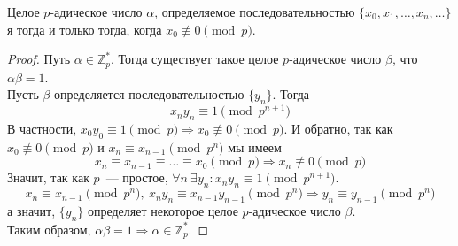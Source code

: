 \documentclass[11pt]{article}
\begin{document}
    \begin{theorem}
        Целое $p$-адическое число $\alpha$, определяемое
        последовательностью $\{ x_0, x_1, \ldots, x_n, \ldots \}$ я тогда и только тогда, когда $x_0 \not\equiv 0 \pmod{p}$.
    \end{theorem}
    \begin{proof}
        Путь $\alpha \in \mathbb{Z}_p^{*}$. Тогда существует такое целое $p$-адическое число $\beta$, что $\alpha \beta = 1$. \\
        Пусть $\beta$ определяется последовательностью $\{ y_n \}$. Тогда
        \[ x_n y_n \equiv 1 \pmod{p^{n + 1}} \]
        В частности, $x_0 y_0 \equiv 1 \pmod{p} \Rightarrow x_0 \not\equiv 0 \pmod{p}$. И обратно, так как $x_0 \not\equiv 0 \pmod{p}$ и $x_n \equiv x_{n - 1} \pmod{p^n}$ мы имеем
        \[ x_n \equiv x_{n - 1} \equiv \ldots \equiv x_0 \pmod{p} \Rightarrow x_n \not\equiv 0 \pmod{p} \]
        Значит, так как $p$~--- простое, $\forall n \ \exists y_n \colon x_n y_n \equiv 1 \pmod{p^{n + 1}}$.
        \[ x_n \equiv x_{n - 1} \pmod{p^n}, \ x_n y_n \equiv x_{n - 1} y_{n - 1} \pmod{p^n} \Rightarrow y_n \equiv y_{n - 1} \pmod{p^n} \]
        а значит, $\{ y_n \}$ определяет некоторое целое $p$-адическое число $\beta$.\\
        Таким образом, $\alpha \beta = 1 \Rightarrow \alpha \in \mathbb{Z}_p^{*}$.
    \end{proof}
\end{document}
